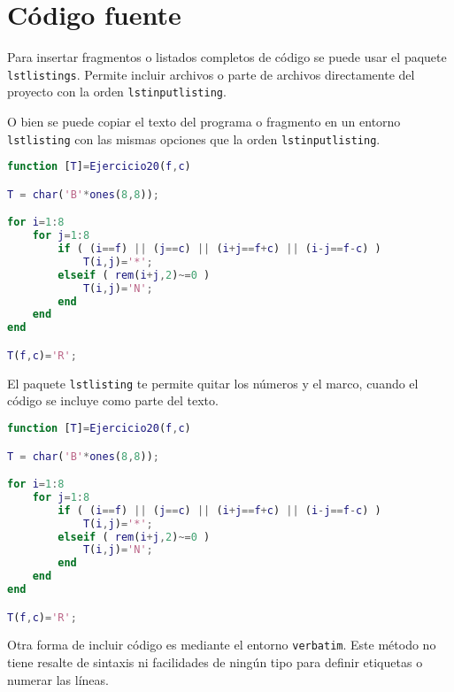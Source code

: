 \section{Código fuente} 
\label{sec:codigo-fuente}

Para insertar fragmentos o listados completos de código se puede usar el paquete \texttt{lstlistings}.  Permite incluir archivos o parte de archivos directamente del proyecto con la orden \texttt{lstinputlisting}.



O bien se puede copiar el texto del programa o fragmento en un entorno \texttt{lstlisting} con las mismas opciones que la orden \texttt{lstinputlisting}.

\begin{lstlisting}[language=Matlab,
    caption={Ejercicio 20 como texto en línea.},
    label=src:ej20-online
]
function [T]=Ejercicio20(f,c)

T = char('B'*ones(8,8));

for i=1:8
    for j=1:8
        if ( (i==f) || (j==c) || (i+j==f+c) || (i-j==f-c) )
            T(i,j)='*';
        elseif ( rem(i+j,2)~=0 )
            T(i,j)='N';
        end
    end
end

T(f,c)='R';
\end{lstlisting}


\noindent El paquete \texttt{lstlisting} te permite quitar los números y el marco, cuando el código se incluye como parte del texto. 

\begin{lstlisting}[language=Matlab,
    frame=none,numbers=none
]
function [T]=Ejercicio20(f,c)

T = char('B'*ones(8,8));

for i=1:8
    for j=1:8
        if ( (i==f) || (j==c) || (i+j==f+c) || (i-j==f-c) )
            T(i,j)='*';
        elseif ( rem(i+j,2)~=0 )
            T(i,j)='N';
        end
    end
end

T(f,c)='R';
\end{lstlisting}

\noindent Otra forma de incluir código es mediante el entorno \texttt{verbatim}.  Este método no tiene resalte de sintaxis ni facilidades de ningún tipo para definir etiquetas o numerar las líneas. 

